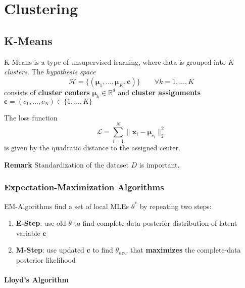 \section{Clustering}

\subsection{K-Means}
K-Means is a type of unsupervised learning, where data is grouped into $K$ \textit{clusters}.
The \textit{hypothesis space}
\noindent\begin{equation*}
    \mathcal{H} = \{(\boldsymbol{\mu}_1,\ldots,\boldsymbol{\mu}_K,\mathbf{c})\}\qquad \forall k=1,\ldots, K
\end{equation*}
consists of \textbf{cluster centers} $\boldsymbol{\mu}_k\in \mathbb{R}^d$ and \textbf{cluster assignments} $\mathbf{c} = (c_1,\ldots,c_N)\in\{1,\ldots, K\}$

\newpar{}
The loss function
\noindent\begin{equation*}
    \mathcal{L}=\sum_{i=1}^{N} \|\mathbf{x}_i-\boldsymbol{\mu}_{c_i} \|_2^2
\end{equation*}
is given by the quadratic distance to the assigned center.

\textbf{Remark}
Standardization of the dataset $D$ is important.

\subsubsection{Expectation-Maximization Algorithms}
EM-Algorithms find a set of local MLEs $\theta^*$ by repeating two steps:
\begin{enumerate}
    \item \textbf{E-Step}: use old $\theta$ to find complete data posterior distribution of latent variable $\mathbf{c}$
    \item \textbf{M-Step}: use updated $\mathbf{c}$ to find $\theta_{new}$ that \textbf{maximizes} the complete-data posterior likelihood
\end{enumerate}

\paragraph{Lloyd's Algorithm}

